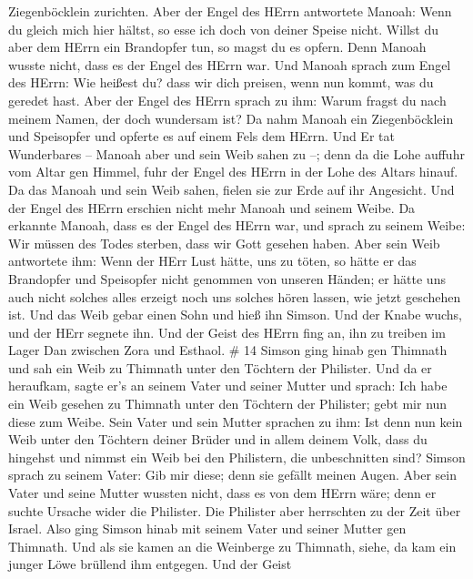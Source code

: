 Ziegenböcklein zurichten.  Aber der Engel des HErrn
antwortete Manoah: Wenn du gleich mich hier hältst, so esse ich doch von
deiner Speise nicht. Willst du aber dem HErrn ein Brandopfer tun, so
magst du es opfern. Denn Manoah wusste nicht, dass es der Engel des
HErrn war.  Und Manoah sprach zum Engel des HErrn: Wie
heißest du? dass wir dich preisen, wenn nun kommt, was du geredet hast.
 Aber der Engel des HErrn sprach zu ihm: Warum fragst du
nach meinem Namen, der doch wundersam ist?  Da nahm Manoah
ein Ziegenböcklein und Speisopfer und opferte es auf einem Fels dem
HErrn. Und Er tat Wunderbares -- Manoah aber und sein Weib sahen zu --;
 denn da die Lohe auffuhr vom Altar gen Himmel, fuhr der
Engel des HErrn in der Lohe des Altars hinauf. Da das Manoah und sein
Weib sahen, fielen sie zur Erde auf ihr Angesicht.  Und der
Engel des HErrn erschien nicht mehr Manoah und seinem Weibe. Da erkannte
Manoah, dass es der Engel des HErrn war,  und sprach zu
seinem Weibe: Wir müssen des Todes sterben, dass wir Gott gesehen haben.
 Aber sein Weib antwortete ihm: Wenn der HErr Lust hätte,
uns zu töten, so hätte er das Brandopfer und Speisopfer nicht genommen
von unseren Händen; er hätte uns auch nicht solches alles erzeigt noch
uns solches hören lassen, wie jetzt geschehen ist.  Und das
Weib gebar einen Sohn und hieß ihn Simson. Und der Knabe wuchs, und der
HErr segnete ihn.  Und der Geist des HErrn fing an, ihn zu
treiben im Lager Dan zwischen Zora und Esthaol. \# 14 
Simson ging hinab gen Thimnath und sah ein Weib zu Thimnath unter den
Töchtern der Philister.  Und da er heraufkam, sagte er's an
seinem Vater und seiner Mutter und sprach: Ich habe ein Weib gesehen zu
Thimnath unter den Töchtern der Philister; gebt mir nun diese zum Weibe.
 Sein Vater und sein Mutter sprachen zu ihm: Ist denn nun
kein Weib unter den Töchtern deiner Brüder und in allem deinem Volk,
dass du hingehst und nimmst ein Weib bei den Philistern, die
unbeschnitten sind? Simson sprach zu seinem Vater: Gib mir diese; denn
sie gefällt meinen Augen.  Aber sein Vater und seine Mutter
wussten nicht, dass es von dem HErrn wäre; denn er suchte Ursache wider
die Philister. Die Philister aber herrschten zu der Zeit über Israel.
 Also ging Simson hinab mit seinem Vater und seiner Mutter
gen Thimnath. Und als sie kamen an die Weinberge zu Thimnath, siehe, da
kam ein junger Löwe brüllend ihm entgegen.  Und der Geist
